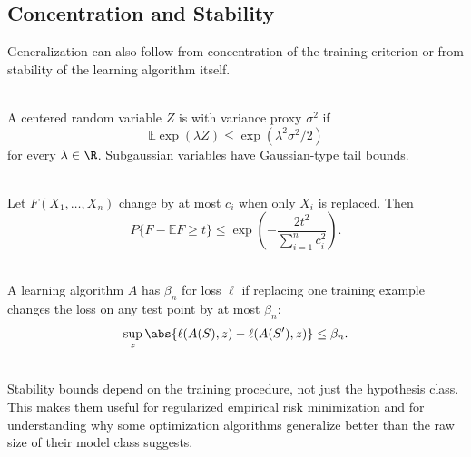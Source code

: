 \subsection{Concentration and Stability}

Generalization can also follow from concentration of the training criterion or from stability of the learning algorithm itself.

\begin{definition} \label{def:sl-subgaussian-random-variable} \\
A centered random variable $Z$ is  with variance proxy $\sigma^2$ if
\[
\mathbb{E}\exp(\lambda Z)\leq \exp(\lambda^2\sigma^2/2)
\]
for every $\lambda\in\R$.  Subgaussian variables have Gaussian-type tail bounds.
\end{definition}

\begin{theorem} \label{thm:sl-mcdiarmid-form} \\
Let $F(X_1,\ldots,X_n)$ change by at most $c_i$ when only $X_i$ is replaced.  Then
\[
P\{F-\mathbb{E}F\geq t\}
\leq
\exp\left(-\frac{2t^2}{\sum_{i=1}^nc_i^2}\right).
\]
\end{theorem}

\begin{definition} \label{def:sl-uniform-stability} \\
A learning algorithm $A$ has  $\beta_n$ for loss $\ell$ if replacing one training example changes the loss on any test point by at most $\beta_n$:
\[
\sup_z\abs{\ell(A(S),z)-\ell(A(S'),z)}\leq\beta_n.
\]
\end{definition}

\begin{remark} \label{rem:sl-stability-generalization} \\
Stability bounds depend on the training procedure, not just the hypothesis class.  This makes them useful for regularized empirical risk minimization and for understanding why some optimization algorithms generalize better than the raw size of their model class suggests.
\end{remark}
